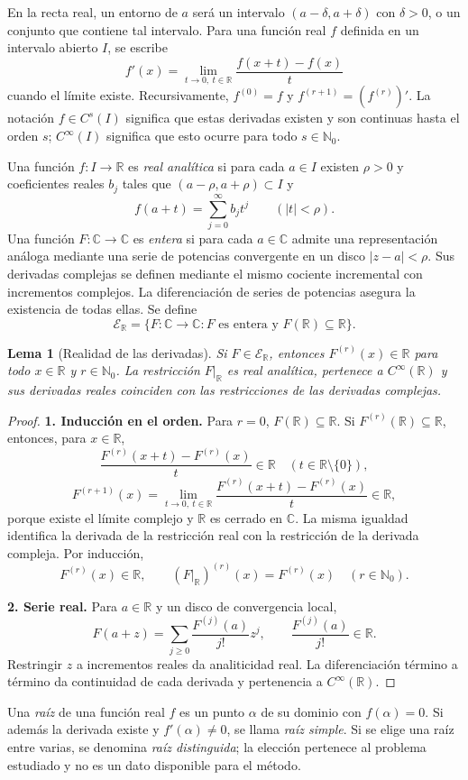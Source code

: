 \documentclass[11pt,a4paper]{article}
\numberwithin{equation}{section}
\newtheorem{lemma}[theorem]{Lema}
\theoremstyle{definition}
\theoremstyle{remark}
\newcommand{\R}{\mathbb R}
\newcommand{\C}{\mathbb C}
\newcommand{\Nn}{\mathbb N_0}
\newcommand{\ER}{\mathcal E_{\R}}
\newcommand{\paso}[1]{\par\smallskip\noindent\textbf{#1}\quad}
\begin{document}
En la recta real, un entorno de $a$ será un intervalo $(a-\delta,a+\delta)$ con $\delta>0$, o un conjunto que contiene tal intervalo. Para una función real $f$ definida en un intervalo abierto $I$, se escribe
\[
f'(x)=\lim_{t\to0,\ t\in\R}\frac{f(x+t)-f(x)}{t}
\]
cuando el límite existe. Recursivamente, $f^{(0)}=f$ y $f^{(r+1)}=(f^{(r)})'$. La notación $f\in C^s(I)$ significa que estas derivadas existen y son continuas hasta el orden $s$; $C^\infty(I)$ significa que esto ocurre para todo $s\in\Nn$.

Una función $f:I\to\R$ es \emph{real analítica} si para cada $a\in I$ existen $\rho>0$ y coeficientes reales $b_j$ tales que $(a-\rho,a+\rho)\subset I$ y
\[
f(a+t)=\sum_{j=0}^{\infty}b_jt^j\qquad(|t|<\rho).
\]
Una función $F:\C\to\C$ es \emph{entera} si para cada $a\in\C$ admite una representación análoga mediante una serie de potencias convergente en un disco $|z-a|<\rho$. Sus derivadas complejas se definen mediante el mismo cociente incremental con incrementos complejos. La diferenciación de series de potencias asegura la existencia de todas ellas. Se define
\[
\ER=\{F:\C\to\C:F\text{ es entera y }F(\R)\subseteq\R\}.
\]

\begin{lemma}[Realidad de las derivadas]\label{lem:real}
Si $F\in\ER$, entonces $F^{(r)}(x)\in\R$ para todo $x\in\R$ y $r\in\Nn$. La restricción $F|_\R$ es real analítica, pertenece a $C^\infty(\R)$ y sus derivadas reales coinciden con las restricciones de las derivadas complejas.
\end{lemma}
\begin{proof}
\paso{1. Inducción en el orden.}
Para $r=0$, $F(\R)\subseteq\R$. Si $F^{(r)}(\R)\subseteq\R$, entonces, para $x\in\R$,
\[
\frac{F^{(r)}(x+t)-F^{(r)}(x)}t\in\R\quad(t\in\R\setminus\{0\}),
\]
\[
F^{(r+1)}(x)=\lim_{t\to0,\ t\in\R}
\frac{F^{(r)}(x+t)-F^{(r)}(x)}t\in\R,
\]
porque existe el límite complejo y $\R$ es cerrado en $\C$. La misma igualdad identifica la derivada de la restricción real con la restricción de la derivada compleja. Por inducción,
\[
F^{(r)}(x)\in\R,\qquad (F|_\R)^{(r)}(x)=F^{(r)}(x)\quad(r\in\Nn).
\]
\paso{2. Serie real.}
Para $a\in\R$ y un disco de convergencia local,
\[
F(a+z)=\sum_{j\ge0}\frac{F^{(j)}(a)}{j!}z^j,
\qquad \frac{F^{(j)}(a)}{j!}\in\R.
\]
Restringir $z$ a incrementos reales da analiticidad real. La diferenciación término a término da continuidad de cada derivada y pertenencia a $C^\infty(\R)$.
\end{proof}

Una \emph{raíz} de una función real $f$ es un punto $\alpha$ de su dominio con $f(\alpha)=0$. Si además la derivada existe y $f'(\alpha)\ne0$, se llama \emph{raíz simple}. Si se elige una raíz entre varias, se denomina \emph{raíz distinguida}; la elección pertenece al problema estudiado y no es un dato disponible para el método.
\end{document}
